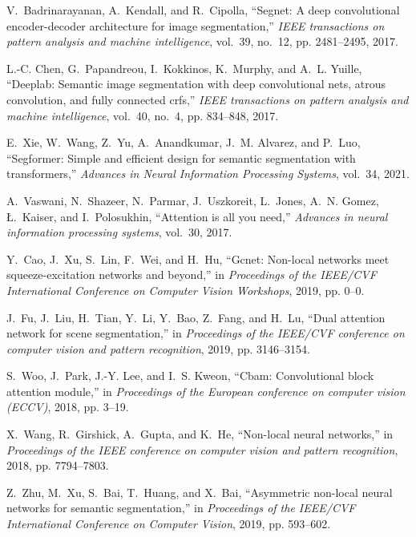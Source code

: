 \documentclass[lettersize,journal]{IEEEtran}
\begin{document}
\begin{thebibliography}{10}
V.~Badrinarayanan, A.~Kendall, and R.~Cipolla, ``Segnet: A deep convolutional
  encoder-decoder architecture for image segmentation,'' \emph{IEEE
  transactions on pattern analysis and machine intelligence}, vol.~39, no.~12,
  pp. 2481--2495, 2017.

L.-C. Chen, G.~Papandreou, I.~Kokkinos, K.~Murphy, and A.~L. Yuille, ``Deeplab:
  Semantic image segmentation with deep convolutional nets, atrous convolution,
  and fully connected crfs,'' \emph{IEEE transactions on pattern analysis and
  machine intelligence}, vol.~40, no.~4, pp. 834--848, 2017.

E.~Xie, W.~Wang, Z.~Yu, A.~Anandkumar, J.~M. Alvarez, and P.~Luo, ``Segformer:
  Simple and efficient design for semantic segmentation with transformers,''
  \emph{Advances in Neural Information Processing Systems}, vol.~34, 2021.

A.~Vaswani, N.~Shazeer, N.~Parmar, J.~Uszkoreit, L.~Jones, A.~N. Gomez,
  {\L}.~Kaiser, and I.~Polosukhin, ``Attention is all you need,''
  \emph{Advances in neural information processing systems}, vol.~30, 2017.

Y.~Cao, J.~Xu, S.~Lin, F.~Wei, and H.~Hu, ``Gcnet: Non-local networks meet
  squeeze-excitation networks and beyond,'' in \emph{Proceedings of the
  IEEE/CVF International Conference on Computer Vision Workshops}, 2019, pp.
  0--0.

J.~Fu, J.~Liu, H.~Tian, Y.~Li, Y.~Bao, Z.~Fang, and H.~Lu, ``Dual attention
  network for scene segmentation,'' in \emph{Proceedings of the IEEE/CVF
  conference on computer vision and pattern recognition}, 2019, pp. 3146--3154.

S.~Woo, J.~Park, J.-Y. Lee, and I.~S. Kweon, ``Cbam: Convolutional block
  attention module,'' in \emph{Proceedings of the European conference on
  computer vision (ECCV)}, 2018, pp. 3--19.

X.~Wang, R.~Girshick, A.~Gupta, and K.~He, ``Non-local neural networks,'' in
  \emph{Proceedings of the IEEE conference on computer vision and pattern
  recognition}, 2018, pp. 7794--7803.

Z.~Zhu, M.~Xu, S.~Bai, T.~Huang, and X.~Bai, ``Asymmetric non-local neural
  networks for semantic segmentation,'' in \emph{Proceedings of the IEEE/CVF
  International Conference on Computer Vision}, 2019, pp. 593--602.


\end{thebibliography}
\end{document}
